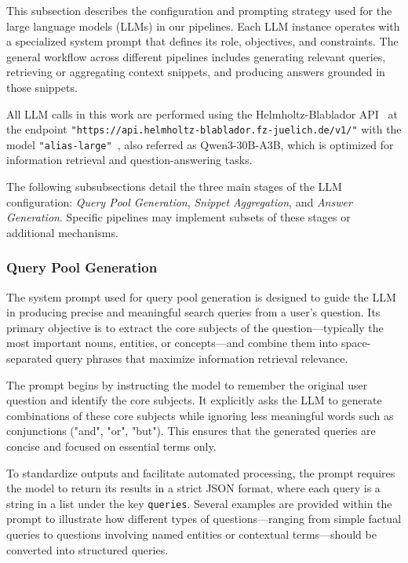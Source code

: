 \documentclass[manuscript,screen]{acmart}
\begin{document}
\begin{CCSXML}
	This subsection describes the configuration and prompting strategy used for the large language models (LLMs) in our pipelines. Each LLM instance operates with a specialized system prompt that defines its role, objectives, and constraints. The general workflow across different pipelines includes generating relevant queries, retrieving or aggregating context snippets, and producing answers grounded in those snippets.
	
	All LLM calls in this work are performed using the Helmholtz-Blablador API~\cite{blablador_api} at the endpoint \texttt{"https://api.helmholtz-blablador.fz-juelich.de/v1/"} with the model \texttt{"alias-large"}~\cite{qwen3_model}, also referred as Qwen3-30B-A3B, which is optimized for information retrieval and question-answering tasks.
	
	The following subsubsections detail the three main stages of the LLM configuration: \textit{Query Pool Generation}, \textit{Snippet Aggregation}, and \textit{Answer Generation}. Specific pipelines may implement subsets of these stages or additional mechanisms.
	
		\subsubsection{Query Pool Generation}
		\label{subsubsec:query-pool-generation}
		
		The system prompt used for query pool generation is designed to guide the LLM in producing precise and meaningful search queries from a user's question. Its primary objective is to extract the core subjects of the question—typically the most important nouns, entities, or concepts—and combine them into space-separated query phrases that maximize information retrieval relevance.
		
		The prompt begins by instructing the model to remember the original user question and identify the core subjects. It explicitly asks the LLM to generate combinations of these core subjects while ignoring less meaningful words such as conjunctions ("and", "or", "but"). This ensures that the generated queries are concise and focused on essential terms only.
		
		To standardize outputs and facilitate automated processing, the prompt requires the model to return its results in a strict JSON format, where each query is a string in a list under the key \texttt{queries}. Several examples are provided within the prompt to illustrate how different types of questions—ranging from simple factual queries to questions involving named entities or contextual terms—should be converted into structured queries.
		

\end{CCSXML}
\end{document}
